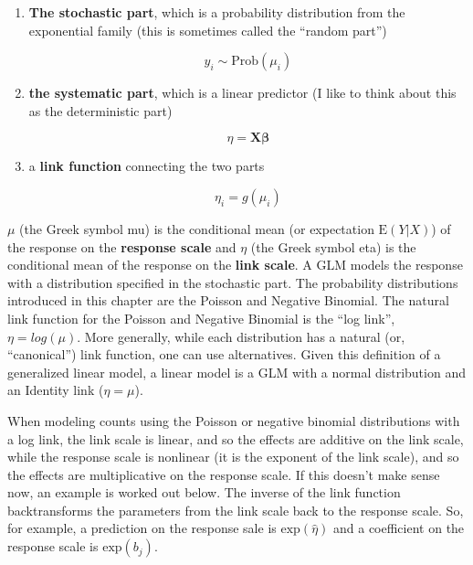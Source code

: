 \documentclass[]{book}
\providecommand{\tightlist}{%
  \setlength{\itemsep}{0pt}\setlength{\parskip}{0pt}}
\begin{document}
\begin{enumerate}
\def\labelenumi{\arabic{enumi}.}
\tightlist
\item
  \textbf{The stochastic part}, which is a probability distribution from
  the exponential family (this is sometimes called the ``random part'')

  \begin{equation}
  y_i \sim \mathrm{Prob}(\mu_i)
  \end{equation}
\item
  \textbf{the systematic part}, which is a linear predictor (I like to
  think about this as the deterministic part)

  \begin{equation}
  \eta=\mathbf{X}\boldsymbol{\beta}
  \end{equation}
\item
  a \textbf{link function} connecting the two parts

  \begin{equation}
  \eta_i = g(\mu_i)
  \end{equation}
\end{enumerate}

\(\mu\) (the Greek symbol mu) is the conditional mean (or expectation
\(\mathrm{E}(Y|X)\)) of the response on the \textbf{response scale} and
\(\eta\) (the Greek symbol eta) is the conditional mean of the response
on the \textbf{link scale}. A GLM models the response with a
distribution specified in the stochastic part. The probability
distributions introduced in this chapter are the Poisson and Negative
Binomial. The natural link function for the Poisson and Negative
Binomial is the ``log link'', \(\eta = log(\mu)\). More generally, while
each distribution has a natural (or, ``canonical'') link function, one
can use alternatives. Given this definition of a generalized linear
model, a linear model is a GLM with a normal distribution and an
Identity link (\(\eta = \mu\)).

When modeling counts using the Poisson or negative binomial
distributions with a log link, the link scale is linear, and so the
effects are additive on the link scale, while the response scale is
nonlinear (it is the exponent of the link scale), and so the effects are
multiplicative on the response scale. If this doesn't make sense now, an
example is worked out below. The inverse of the link function
backtransforms the parameters from the link scale back to the response
scale. So, for example, a prediction on the response sale is
\(\mathrm{exp}(\hat{\eta})\) and a coefficient on the response scale is
\(\mathrm{exp}(b_j)\).
\end{document}
